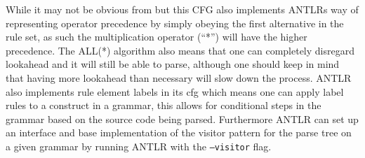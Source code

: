 While it may not be obvious from  but this CFG also implements ANTLRs way of representing operator precedence by simply obeying the first alternative in the rule set, as such the multiplication operator (``*'') will have the higher precedence.
The ALL(*) algorithm also means that one can completely disregard lookahead and it will still be able to parse, although one should keep in mind that having more lookahead than necessary will slow down the process.
ANTLR also implements rule element labels in its \gls{cfg} which means one can apply label rules to a construct in a grammar, this allows for conditional steps in the grammar based on the source code being parsed.
Furthermore ANTLR can set up an interface and base implementation of the visitor pattern for the parse tree on a given grammar by running ANTLR with the \texttt{--visitor} flag.\citep{ALLSTAR, LLSTAR, ANTLR4_Book}


